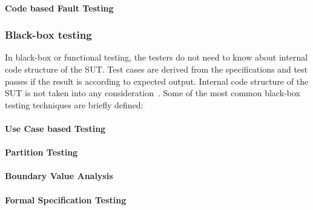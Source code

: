 \paragraph{Code based Fault Testing}



\subsubsection{Black-box testing}
In black-box or functional testing, the testers do not need to know about internal code structure of the SUT. Test cases are derived from the specifications and test passes if the result is according to expected output. Internal code structure of the SUT is not taken into any consideration~\cite{beizer1995black}. Some of the most common black-box testing techniques are briefly defined:
\paragraph{Use Case based Testing}
\paragraph{Partition Testing}
\paragraph{Boundary Value Analysis}
\paragraph{Formal Specification Testing}









